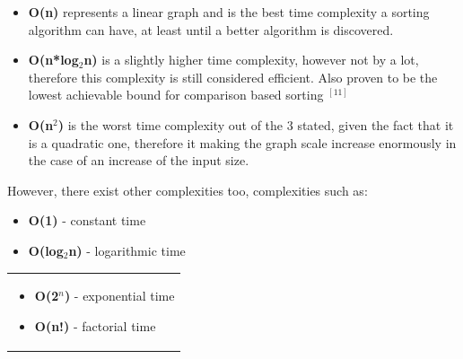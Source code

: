 \documentclass{article}
\begin{document}
\begin{itemize}
\item \textbf{O(n)} represents a linear graph and is the best time complexity a sorting algorithm can have, at least until a better algorithm is discovered. 


\item \textbf{O(n*log$_2$n)} is a slightly higher time complexity, however not by a lot, therefore this complexity is still considered efficient. Also proven to be the lowest achievable bound for comparison based sorting $^{[11]}$


\item \textbf{O(n$^2$)} is the worst time complexity out of the 3 stated, given the fact that it is a quadratic one, therefore it making the graph scale increase enormously in the case of an increase of the input size.
\end{itemize}

However, there exist other complexities too, complexities such as:
\newline
\begin{minipage}{0.45\textwidth}
\begin{itemize}
  \item \textbf{O(1)} - constant time
  \item \textbf{O(log$_2$n)} - logarithmic time
\end{itemize}
\end{minipage}%
\hfill
\begin{minipage}{0.45\textwidth}
\begin{tabular}{p{\textwidth}}
\begin{itemize}
    \item \textbf{O(2$^{n}$)} - exponential time
    \item \textbf{O(n!)} - factorial time
\end{itemize}
\end{tabular}
\end{minipage}%


\clearpage
\end{document}

